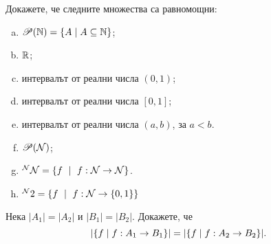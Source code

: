   



\begin{problem}
  Докажете, че следните множества са равномощни:
  \begin{enumerate}[a)]
  \item
    $\mathscr{P}(\mathbb{N}) = \{A \mid A \subseteq \mathbb{N}\}$;
  \item
    $\mathbb{R}$;
  \item
    интервалът от реални числа $(0,1)$;
  \item
    интервалът от реални числа $[0,1]$;
  \item
    интервалът от реални числа $(a,b)$, за $a<b$.
  \item
    $\mathscr{P}(\mathcal{N})$;
  \item
    $^\N\N = \{f\ \mid\ f:\N\to\N\}$.
  \item
    $^\N2 = \{f\ \mid\ f:\N\to\{0,1\}\}$
  \end{enumerate}
\end{problem}

\begin{problem}
  Нека $|A_1| = |A_2|$ и $|B_1| = |B_2|$.
  Докажете, че \[\lvert{\{f\mid f:A_1\to B_1\}}\rvert = \lvert{\{f\mid f:A_2\to B_2\}}\rvert.\]
\end{problem}


